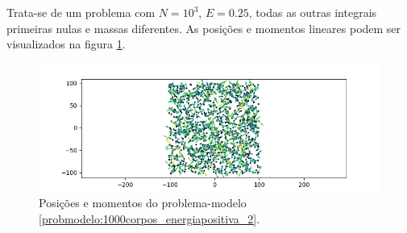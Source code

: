 \begin{probmodelo}[1000 corpos e $E=0.25$ (massas diferentes)]\label{probmodelo:1000corpos_energiapositiva_2}
    Trata-se de um problema com $N=10^3$, $E=0.25$, todas as outras integrais primeiras nulas e massas diferentes. As posições e momentos lineares podem ser visualizados na figura \ref{fig:probmodelo_1000corpos_E_positiva_2}.
    \begin{figure}[H]
        \centering
        \includegraphics[width=0.5\linewidth]{tcc//img/1000corpos_E_positiva_2.png}
        \caption{Posições e momentos do problema-modelo \ref{probmodelo:1000corpos_energiapositiva_2}.}
        \label{fig:probmodelo_1000corpos_E_positiva_2}
    \end{figure}
\end{probmodelo}
